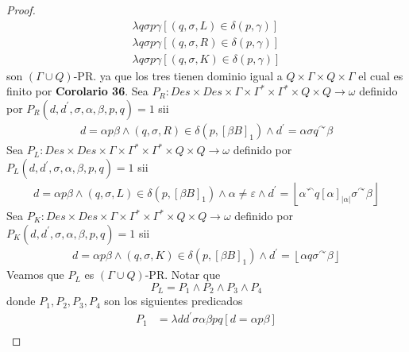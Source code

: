 \begin{proof}
    \begin{eqnarray*}
      \lambda q\sigma p\gamma \left[ (q,\sigma ,L)\in \delta (p,\gamma )\right] \\
      \lambda q\sigma p\gamma \left[ (q,\sigma ,R)\in \delta (p,\gamma )\right] \\
      \lambda q\sigma p\gamma \left[ (q,\sigma ,K)\in \delta (p,\gamma )\right]
    \end{eqnarray*}
    son $(\Gamma \cup Q)$-PR. ya que los tres tienen dominio igual a $Q\times \Gamma \times Q\times \Gamma $ el cual es
    finito por \textbf{Corolario 36}.
    Sea $P_{R}:Des\times Des\times\Gamma\times\Gamma ^{\ast }\times \Gamma ^{\ast }\times Q\times Q\rightarrow \omega $
    definido por $P_{R}(d,d^{\prime },\sigma ,\alpha ,\beta ,p,q)=1$ sii
    \begin{eqnarray*}
      d=\alpha p\beta \wedge (q,\sigma ,R)\in \delta \left( p,\left[ \beta B\right] _{1}\right) \wedge
      d^{\prime }=\alpha \sigma q^{\curvearrowright }\beta
    \end{eqnarray*}
    Sea $P_{L}:Des\times Des\times\Gamma\times\Gamma ^{\ast }\times \Gamma ^{\ast }\times Q\times Q\rightarrow \omega$
    definido por $P_{L}(d,d^{\prime },\sigma ,\alpha ,\beta ,p,q)=1$ sii
    \begin{eqnarray*}
      d=\alpha p\beta \wedge
      (q,\sigma ,L)\in \delta \left( p,\left[ \beta B\right] _{1}\right) \wedge
      \alpha \neq \varepsilon \wedge
      d^{\prime }=\left\lfloor \alpha ^{\curvearrowleft }q\left[ \alpha \right]
      _{\left\vert \alpha \right\vert }\sigma ^{\curvearrowright }\beta \right\rfloor
    \end{eqnarray*}
    Sea $P_{K}:Des\times Des\times\Gamma\times \Gamma ^{\ast }\times \Gamma ^{\ast }\times Q\times Q\rightarrow \omega$
    definido por $P_{K}(d,d^{\prime },\sigma ,\alpha ,\beta ,p,q)=1$ sii
    \begin{eqnarray*}
      d=\alpha p\beta \wedge
      (q,\sigma ,K)\in \delta \left( p,\left[ \beta B\right] _{1}\right) \wedge
      d^{\prime }=\left\lfloor \alpha q\sigma ^{\curvearrowright }\beta \right\rfloor
    \end{eqnarray*}
    \PN \noindent Veamos que $P_L$ es $(\Gamma \cup Q)$-PR. Notar que
    \[
      P_L = P_1 \land P_2 \land P_3 \land P_4
    \]
    donde $P_1, P_2,  P_3, P_4$ son los siguientes predicados
    \begin{align*}
      P_1 &=  \lambda d d^{\prime}\sigma\alpha\beta p q \left[ d=\alpha p\beta \right] \\

\end{align*}
\end{proof}
